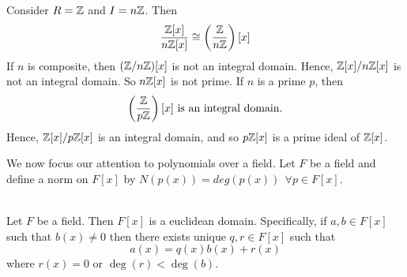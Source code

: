 \begin{example}
    Consider $R = \mathbb{Z}$ and $I = n\mathbb{Z}$. Then
    $$\dfrac{\mathbb{Z}[x]}{n\mathbb{Z}[x]} \cong \left(\dfrac{\mathbb{Z}}{n\mathbb{Z}}\right)[x]$$
    If $n$ is composite, then $(\mathbb{Z}/n\mathbb{Z})[x]$ is not an integral domain. Hence, $\mathbb{Z}[x]/n\mathbb{Z}[x]$ is not an integral domain. So $n\mathbb{Z}[x]$ is not prime. If $n$ is a prime $p$, then 
    $$\left(\dfrac{\mathbb{Z}}{p\mathbb{Z}}\right)[x] \text{ is an integral domain.}$$
    Hence, $\mathbb{Z}[x]/p\mathbb{Z}[x]$ is an integral domain, and so $p\mathbb{Z}[x]$ is a prime ideal of $\mathbb{Z}[x]$.
\end{example}

We now focus our attention to polynomials over a field. Let $F$ be a field and define a norm on $F[x]$ by $N(p(x)) = deg(p(x)) ~~\forall p\in F[x]$.

\begin{theorem} \leavevmode \\
    Let $F$ be a field. Then $F[x]$ is a euclidean domain. Specifically, if $a,b \in F[x]$ such that $b(x) \neq 0$ then there exists unique $q, r\in F[x]$ such that 
    $$a(x) = q(x)b(x) + r(x)$$
    where $r(x) = 0$ or $\deg (r) < \deg (b)$.
\end{theorem}


